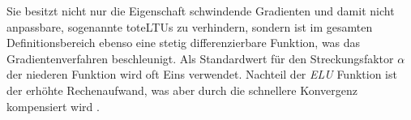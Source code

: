 Sie besitzt nicht nur die Eigenschaft schwindende Gradienten und damit nicht anpassbare, sogenannte \glqq tote\grqq LTUs zu verhindern, sondern ist im gesamten Definitionsbereich ebenso eine stetig differenzierbare Funktion, was das Gradientenverfahren beschleunigt. Als Standardwert für den Streckungsfaktor $\alpha$ der niederen Funktion wird oft Eins verwendet. Nachteil der \textit{ELU} Funktion ist der erhöhte Rechenaufwand, was aber durch die schnellere Konvergenz kompensiert wird \cite{AurelienGeron.2018}.

